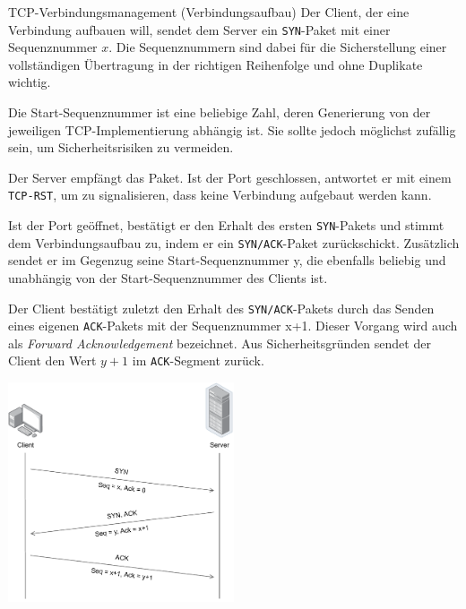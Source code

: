 \begin{defi}{TCP-Verbindungsmanagement (Verbindungsaufbau)}
    Der Client, der eine Verbindung aufbauen will, sendet dem Server ein \texttt{SYN}-Paket mit einer Sequenznummer $x$.
    Die Sequenznummern sind dabei für die Sicherstellung einer vollständigen Übertragung in der richtigen Reihenfolge und ohne Duplikate wichtig.

    Die Start-Sequenznummer ist eine beliebige Zahl, deren Generierung von der jeweiligen TCP-Implementierung abhängig ist.
    Sie sollte jedoch möglichst zufällig sein, um Sicherheitsrisiken zu vermeiden.

    Der Server empfängt das Paket. Ist der Port geschlossen, antwortet er mit einem \texttt{TCP-RST}, um zu signalisieren, dass keine Verbindung aufgebaut werden kann.

    Ist der Port geöffnet, bestätigt er den Erhalt des ersten \texttt{SYN}-Pakets und stimmt dem Verbindungsaufbau zu, indem er ein \texttt{SYN/ACK}-Paket zurückschickt.
    Zusätzlich sendet er im Gegenzug seine Start-Sequenznummer y, die ebenfalls beliebig und unabhängig von der Start-Sequenznummer des Clients ist.

    Der Client bestätigt zuletzt den Erhalt des \texttt{SYN/ACK}-Pakets durch das Senden eines eigenen \texttt{ACK}-Pakets mit der Sequenznummer x+1. Dieser Vorgang wird auch als \emph{Forward Acknowledgement} bezeichnet.
    Aus Sicherheitsgründen sendet der Client den Wert $y+1$ im \texttt{ACK}-Segment zurück.

    \centering
    \includegraphics[width=0.5\textwidth]{includes/figures/defi_tcp_verbindungsaufbau.pdf}
\end{defi}

